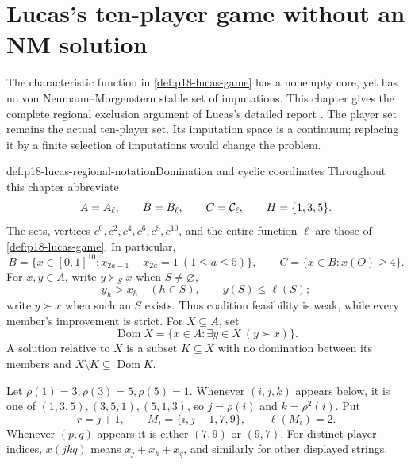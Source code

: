 \chapter{Lucas's ten-player game without an NM solution}
\label{sec:p18-lucas-no-solution}

The characteristic function in \cref{def:p18-lucas-game} has a
nonempty core, yet has no von Neumann--Morgenstern stable set of
imputations. This chapter gives the complete regional exclusion
argument of Lucas's detailed report
\cite[secs.~4--8, pp.~6--18]{Lucas1968NoSolutionProof}.
The player set remains the actual ten-player set. Its imputation
space is a continuum; replacing it by a finite selection of
imputations would change the problem.

\begin{hbdefinition}{def:p18-lucas-regional-notation}{Domination and cyclic coordinates}
Throughout this chapter abbreviate
\[
 A=A_\ell,\qquad B=B_\ell,\qquad C={\cal C}_\ell,
 \qquad H=\{1,3,5\}.
\]
The sets, vertices \(c^0,c^2,c^4,c^6,c^8,c^{10}\), and the entire
function \(\ell\) are those of \cref{def:p18-lucas-game}.
In particular,
\[
 B=\{x\in[0,1]^{10}:x_{2a-1}+x_{2a}=1\ (1\leq a\leq5)\},
 \qquad C=\{x\in B:x(O)\geq4\}.
\]
For \(x,y\in A\), write \(y\succ_S x\) when \(S\ne\varnothing\),
\[
 y_h>x_h\quad(h\in S),\qquad y(S)\leq\ell(S);
\]
write \(y\succ x\) when such an \(S\) exists. Thus coalition
feasibility is weak, while every member's improvement is strict.
For \(X\subseteq A\), set
\[
 \operatorname{Dom}X=\{x\in A:\exists y\in X\ (y\succ x)\}.
\]
A solution relative to \(X\) is a subset \(K\subseteq X\) with no
domination between its members and
\(X\setminus K\subseteq\operatorname{Dom}K\).

Let \(\rho(1)=3,\rho(3)=5,\rho(5)=1\). Whenever \((i,j,k)\)
appears below, it is one of
\((1,3,5),(3,5,1),(5,1,3)\), so \(j=\rho(i)\) and
\(k=\rho^2(i)\). Put
\[
 r=j+1,\qquad M_i=\{i,j+1,7,9\},\qquad \ell(M_i)=2.
\]
Whenever \((p,q)\) appears it is either \((7,9)\) or \((9,7)\).
For distinct player indices, \(x(jkq)\) means
\(x_j+x_k+x_q\), and similarly for other displayed strings.
\end{hbdefinition}

